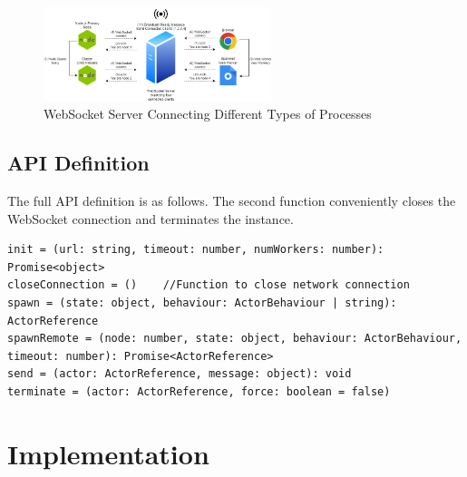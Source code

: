 \documentclass[lettersize,journal]{IEEEtran}
\begin{document}
\begin{figure}[H]
    \begin{centering}
        \includegraphics[width=251px]{resources/websocketconnectioncomplex.png}
        \caption{WebSocket Server Connecting Different Types of Processes}
    \end{centering}
\end{figure}

\subsection{API Definition}
The full API definition is as follows. The second function conveniently closes the WebSocket connection and terminates the instance.
\begin{lstlisting}
init = (url: string, timeout: number, numWorkers: number): Promise<object>
closeConnection = ()    //Function to close network connection
spawn = (state: object, behaviour: ActorBehaviour | string): ActorReference
spawnRemote = (node: number, state: object, behaviour: ActorBehaviour, timeout: number): Promise<ActorReference>
send = (actor: ActorReference, message: object): void
terminate = (actor: ActorReference, force: boolean = false)
\end{lstlisting}
\section{Implementation}
\end{document}
